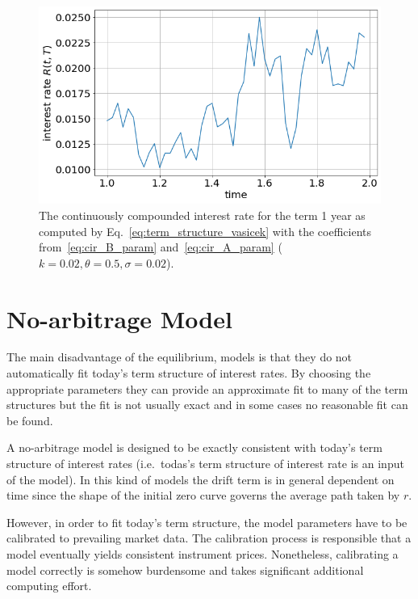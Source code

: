 \begin{figure}[htb]
	\centering
	\includegraphics[width=0.7\linewidth]{figures/cir_interest_rate}
	\caption{The continuously compounded interest rate for the term 1 year as computed by Eq.~\ref{eq:term_structure_vasicek} with the coefficients from~\ref{eq:cir_B_param} and~\ref{eq:cir_A_param} ($k=0.02, \theta=0.5, \sigma=0.02$).}
	\label{fig:cir_interest}
\end{figure}

\section{No-arbitrage Model}
\label{no-arbitrage-model}

The main disadvantage of the equilibrium, models is that they do not automatically fit today's term structure of interest rates. By choosing the appropriate parameters they can provide an approximate fit to many of the term structures but the fit is not usually exact and in some cases no reasonable fit can be found.

A no-arbitrage model is designed to be exactly consistent with today's term structure of interest rates (i.e.~todas's term structure of interest rate is an input of the model). In this kind of models the drift term is in general dependent on time since the shape of the initial zero curve governs the average path taken by \(r\).

However, in order to fit today’s term structure, the model parameters have to be calibrated to prevailing market data. The calibration process is responsible that a model eventually yields consistent instrument prices. Nonetheless, calibrating a model correctly is somehow burdensome and takes significant additional computing effort.

